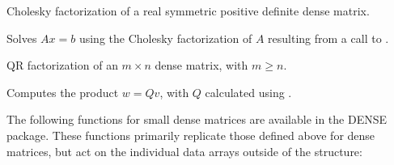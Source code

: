 \documentclass[letterpaper,10pt,english]{sphinxmanual}
\begin{document}

\begin{fulllineitems}
\label{linear_solvers/DLS:DensePOTRF}
Cholesky factorization of a real symmetric positive definite dense matrix.

\end{fulllineitems}


\begin{fulllineitems}
\label{linear_solvers/DLS:DensePOTRS}
Solves $Ax = b$ using the Cholesky factorization of $A$
resulting from a call to {\hyperref[linear_solvers/DLS:DensePOTRF]{}}.

\end{fulllineitems}


\begin{fulllineitems}
\label{linear_solvers/DLS:DenseGEQRF}
QR factorization of an $m \times n$ dense matrix, with $m \ge n$.

\end{fulllineitems}


\begin{fulllineitems}
\label{linear_solvers/DLS:DenseORMQR}
Computes the product $w = Qv$, with $Q$ calculated
using {\hyperref[linear_solvers/DLS:DenseGEQRF]{}}.

\end{fulllineitems}


The following functions for small dense matrices are available in the
DENSE package.  These functions primarily replicate those defined above
for {\hyperref[linear_solvers/DLS:DlsMat]{}} dense matrices, but act on the individual data
arrays outside of the {\hyperref[linear_solvers/DLS:DlsMat]{}} structure:
\end{document}
